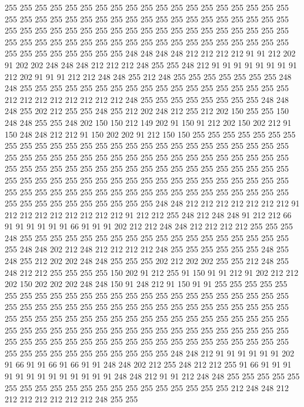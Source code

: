 255 255 255 255 255 255 255 255 255 255 255 255 255 255 255 255 255 255 255 255
255 255 255 255 255 255 255 255 255 255 255 255 255 255 255 255 255 255 255 255
255 255 255 255 255 255 255 255 255 255 255 255 255 255 255 255 255 255 255 255
255 255 255 255 255 255 255 255 255 255 255 255 255 255 255 255 255 255 255 255
255 255 255 255 248 248 248 248 212 212 212 212 91 91 212 202 91 202 202 248
248 248 212 212 212 248 255 255 248 212 91 91 91 91 91 91 91 91 212 202
91 91 91 212 212 248 248 255 212 248 255 255 255 255 255 255 255 248 248 255
255 255 255 255 255 255 255 255 255 255 255 255 255 255 255 255 255 212 212 212
212 212 212 212 212 248 255 255 255 255 255 255 255 255 248 248 248 255 202 212
255 255 248 255 212 202 248 212 255 212 202 150 255 255 150 248 248 255 255 248
202 150 150 212 149 202 91 150 91 212 202 150 202 212 91 150 248 248 212 212
91 150 202 202 91 212 150 150 255 255 255 255 255 255 255 255 255 255 255 255
255 255 255 255 255 255 255 255 255 255 255 255 255 255 255 255 255 255 255 255
255 255 255 255 255 255 255 255 255 255 255 255 255 255 255 255 255 255 255 255
255 255 255 255 255 255 255 255 255 255 255 255 255 255 255 255 255 255 255 255
255 255 255 255 255 255 255 255 255 255 255 255 255 255 255 255 255 255 255 255
255 255 255 255 255 255 255 255 255 255 255 255 255 255 255 255 255 255 255 255
248 248 212 212 212 212 212 212 212 91 212 212 212 212 212 212 212 212 91 212
212 255 248 212 248 248 91 212 212 66 91 91 91 91 91 91 66 91 91 91
202 212 212 248 248 212 212 212 212 255 255 255 248 255 255 255 255 255 255 255
255 255 255 255 255 255 255 255 255 255 255 255 248 248 202 212 248 212 212 212
212 248 255 255 255 255 255 255 248 255 248 255 212 202 202 248 248 255 255 255
202 212 202 202 255 255 212 248 255 248 212 212 255 255 255 255 150 202 91 212
255 91 150 91 91 212 91 202 212 212 202 150 202 202 202 248 248 150 91 248
212 91 150 91 91 255 255 255 255 255 255 255 255 255 255 255 255 255 255 255
255 255 255 255 255 255 255 255 255 255 255 255 255 255 255 255 255 255 255 255
255 255 255 255 255 255 255 255 255 255 255 255 255 255 255 255 255 255 255 255
255 255 255 255 255 255 255 255 255 255 255 255 255 255 255 255 255 255 255 255
255 255 255 255 255 255 255 255 255 255 255 255 255 255 255 255 255 255 255 255
255 255 255 255 255 255 255 255 255 255 255 255 255 255 255 255 248 248 212 91
91 91 91 91 91 202 91 66 91 91 66 91 66 91 91 248 248 202 212 255
248 212 212 255 91 66 91 91 91 91 91 91 91 91 91 91 91 91 91 248
248 212 91 91 212 248 248 255 255 255 255 255 255 255 255 255 255 255 255 255
255 255 255 255 255 255 255 212 248 248 212 212 212 212 212 212 212 248 255 255
